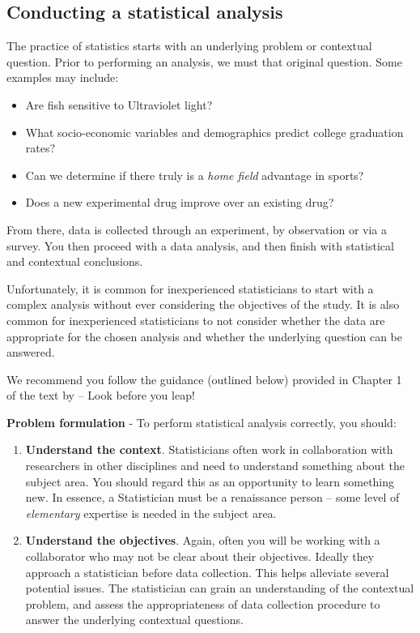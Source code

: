 \documentclass[
]{book}
\providecommand{\tightlist}{%
  \setlength{\itemsep}{0pt}\setlength{\parskip}{0pt}}
\begin{document}
\hypertarget{conducting-a-statistical-analysis}{%
\subsection{Conducting a statistical analysis}\label{conducting-a-statistical-analysis}}

The practice of statistics starts with an underlying problem or contextual question. Prior to performing an analysis, we must that original question. Some examples may include:

\begin{itemize}
\tightlist
\item
  Are fish sensitive to Ultraviolet light?
\item
  What socio-economic variables and demographics predict college graduation rates?
\item
  Can we determine if there truly is a \emph{home field} advantage in sports?
\item
  Does a new experimental drug improve over an existing drug?
\end{itemize}

From there, data is collected through an experiment, by observation or via a survey. You then proceed with a data analysis, and then finish with statistical and contextual conclusions.

Unfortunately, it is common for inexperienced statisticians to start with a complex analysis without ever considering the objectives of the study. It is also common for inexperienced statisticians to not consider whether the data are appropriate for the chosen analysis and whether the underlying question can be answered.

We recommend you follow the guidance (outlined below) provided in Chapter 1 of the text by \citet{Faraway2004linear} -- Look before you leap!

\textbf{Problem formulation} - To perform statistical analysis correctly, you should:

\begin{enumerate}
\def\labelenumi{\arabic{enumi}.}
\item
  \textbf{Understand the context}. Statisticians often work in collaboration with researchers in other disciplines and need to understand something about the subject area. You should regard this as an opportunity to learn something new. In essence, a Statistician must be a renaissance person -- some level of \emph{elementary} expertise is needed in the subject area.
\item
  \textbf{Understand the objectives}. Again, often you will be working with a collaborator who may not be clear about their objectives. Ideally they approach a statistician before data collection. This helps alleviate several potential issues. The statistician can grain an understanding of the contextual problem, and assess the appropriateness of data collection procedure to answer the underlying contextual questions.
\end{enumerate}
\end{document}
